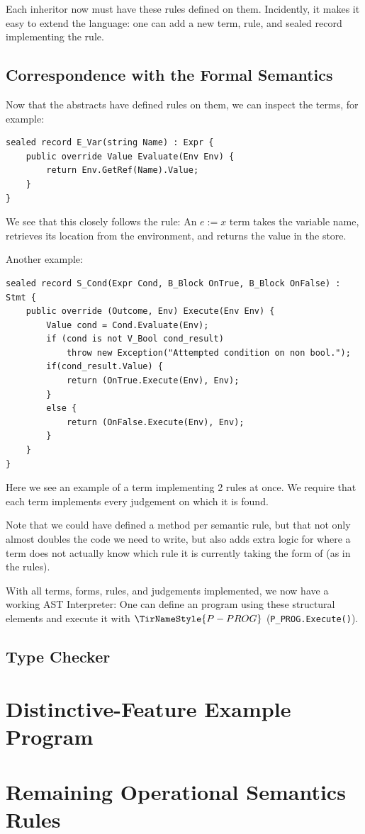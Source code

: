 \documentclass[11pt,a4paper]{article}
\newcommand{\rn}[1]{\TirNameStyle{#1}}
\begin{document}
Each inheritor now must have these rules defined on them. Incidently, it makes it easy to extend the language: one can add a new term, rule, and sealed record implementing the rule.
\subsection{Correspondence with the Formal Semantics}

Now that the abstracts have defined rules on them, we can inspect the terms, for example:

\begin{lstlisting}[language=CSharp, tabsize=4]
sealed record E_Var(string Name) : Expr {
	public override Value Evaluate(Env Env) {
		return Env.GetRef(Name).Value;
	}
}
\end{lstlisting}

We see that this closely follows the \rn{E-VAR} rule: An $e := x$ term takes the variable name, retrieves its location from the environment, and returns the value in the store. 

Another example:
\begin{lstlisting}[language=CSharp, tabsize=4]
sealed record S_Cond(Expr Cond, B_Block OnTrue, B_Block OnFalse) : Stmt {
	public override (Outcome, Env) Execute(Env Env) {
		Value cond = Cond.Evaluate(Env);
		if (cond is not V_Bool cond_result) 
			throw new Exception("Attempted condition on non bool.");
		if(cond_result.Value) {
			return (OnTrue.Execute(Env), Env);
		}
		else {
			return (OnFalse.Execute(Env), Env);
		}
	}
}
\end{lstlisting}

Here we see an example of a term implementing 2 rules at once. We require that each term implements every judgement on which it is found.

Note that we could have defined a method per semantic rule, but that not only almost doubles the code we need to write, but also adds extra logic for where a term does not actually know which rule it is currently taking the form of (as in the \rn{S-WHILE} rules).

With all terms, forms, rules, and judgements implemented, we now have a working AST Interpreter: One can define an program using these structural elements and execute it with $\rn{P-PROG}$ (\texttt{P\_PROG.Execute()}).

\subsection{Type Checker}




\section{Distinctive-Feature Example Program}

\appendix
\section{Remaining Operational Semantics Rules}
\end{document}
